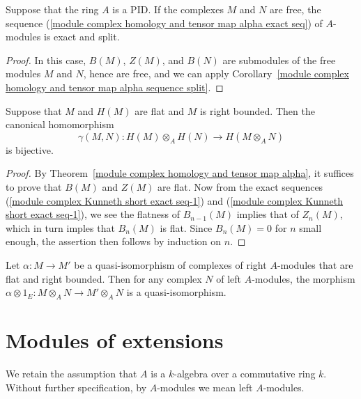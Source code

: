 \begin{corollary}
Suppose that the ring $A$ is a PID. If the complexes $M$ and $N$ are free, the sequence (\ref{module complex homology and tensor map alpha exact seq}) of $A$-modules is exact and split.
\end{corollary}
\begin{proof}
In this case, $B(M)$, $Z(M)$, and $B(N)$ are submodules of the free modules $M$ and $N$, hence are free, and we can apply Corollary~\ref{module complex homology and tensor map alpha sequence split}.
\end{proof}
\begin{corollary}
Suppose that $M$ and $H(M)$ are flat and $M$ is right bounded. Then the canonical homomorphism
\[\gamma(M,N):H(M)\otimes_AH(N)\to H(M\otimes_AN)\]
is bijective.
\end{corollary}
\begin{proof}
By Theorem~\ref{module complex homology and tensor map alpha}, it suffices to prove that $B(M)$ and $Z(M)$ are flat. Now from the exact sequences (\ref{module complex Kunneth short exact seq-1}) and (\ref{module complex Kunneth short exact seq-1}), we see the flatness of $B_{n-1}(M)$ implies that of $Z_n(M)$, which in turn imples that $B_{n}(M)$ is flat. Since $B_n(M)=0$ for $n$ small enough, the assertion then follows by induction on $n$.
\end{proof}
\begin{corollary}\label{module complex flat right bounded preserve quasi-iso}
Let $\alpha:M\to M'$ be a quasi-isomorphism of complexes of right $A$-modules that are flat and right bounded. Then for any complex $N$ of left $A$-modules, the morphism $\alpha\otimes 1_E:M\otimes_AN\to M'\otimes_AN$ is a quasi-isomorphism.
\end{corollary}
\section{Modules of extensions}
We retain the assumption that $A$ is a $k$-algebra over a commutative ring $k$. Without further specification, by $A$-modules we mean left $A$-modules.
